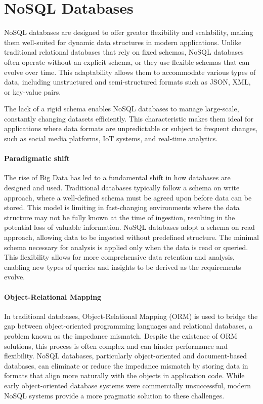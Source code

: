 \section{NoSQL Databases}

NoSQL databases are designed to offer greater flexibility and scalability, making them well-suited for dynamic data structures in modern applications. 
Unlike traditional relational databases that rely on fixed schemas, NoSQL databases often operate without an explicit schema, or they use flexible schemas that can evolve over time. 
This adaptability allows them to accommodate various types of data, including unstructured and semi-structured formats such as JSON, XML, or key-value pairs.

The lack of a rigid schema enables NoSQL databases to manage large-scale, constantly changing datasets efficiently. 
This characteristic makes them ideal for applications where data formats are unpredictable or subject to frequent changes, such as social media platforms, IoT systems, and real-time analytics.

\paragraph*{Paradigmatic shift}
The rise of Big Data has led to a fundamental shift in how databases are designed and used. 
Traditional databases typically follow a schema on write approach, where a well-defined schema must be agreed upon before data can be stored. 
This model is limiting in fast-changing environments where the data structure may not be fully known at the time of ingestion, resulting in the potential loss of valuable information.
NoSQL databases adopt a schema on read approach, allowing data to be ingested without predefined structure. 
The minimal schema necessary for analysis is applied only when the data is read or queried. 
This flexibility allows for more comprehensive data retention and analysis, enabling new types of queries and insights to be derived as the requirements evolve.

\paragraph*{Object-Relational Mapping}
In traditional databases, Object-Relational Mapping (ORM) is used to bridge the gap between object-oriented programming languages and relational databases, a problem known as the impedance mismatch.
Despite the existence of ORM solutions, this process is often complex and can hinder performance and flexibility. 
NoSQL databases, particularly object-oriented and document-based databases, can eliminate or reduce the impedance mismatch by storing data in formats that align more naturally with the objects in application code. 
While early object-oriented database systems were commercially unsuccessful, modern NoSQL systems provide a more pragmatic solution to these challenges.


